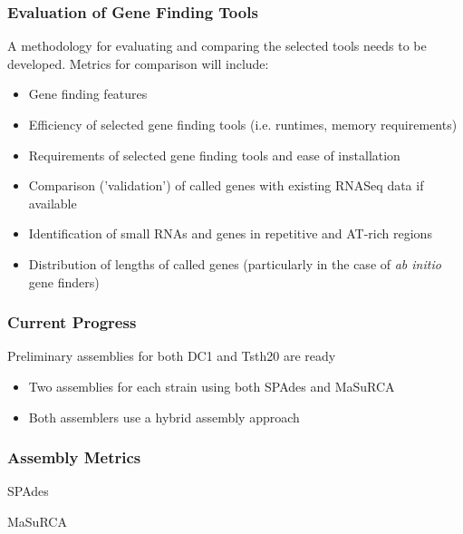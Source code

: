 \documentclass{beamer}
\begin{document}
\begin{frame}
  \frametitle{Evaluation of Gene Finding Tools} A methodology for
  evaluating and comparing the selected tools needs to be
  developed. Metrics for comparison will include:
  \begin{itemize}
  \item Gene finding features
  \item Efficiency of selected gene finding tools (i.e. runtimes,
    memory requirements)
  \item Requirements of selected gene finding tools and ease of
    installation
  \item Comparison ('validation') of called genes with existing RNASeq data if
    available
  \item Identification of small RNAs and genes in repetitive and
    AT-rich regions
  \item Distribution of lengths of called genes (particularly in the
    case of \textit{ab initio} gene finders)
  \end{itemize}
\end{frame}

\begin{frame}
  \frametitle{Current Progress}
  Preliminary assemblies for both DC1 and Tsth20 are ready
  \begin{itemize}
  \item Two assemblies for each strain using both SPAdes and MaSuRCA
  \item Both assemblers use a hybrid assembly approach
  \end{itemize}
\end{frame}

\begin{frame}
  \frametitle{Assembly Metrics}
  SPAdes
  \begin{center}
    \label{table1} \vspace{0.5cm}
  \end{center}
  MaSuRCA
  \begin{center}
  \label{table1} \vspace{0.5cm}
  \end{center}
\end{frame}
\end{document}
